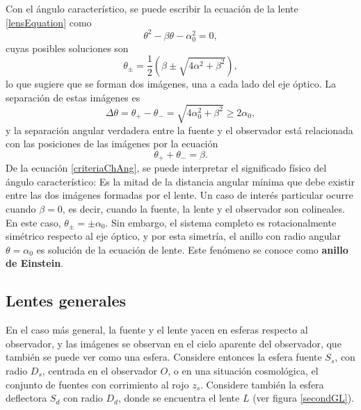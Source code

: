 Con el ángulo característico, se puede escribir la ecuación de la lente \eqref{lensEquation} como
\begin{equation}
	\theta^2-\beta\theta-\alpha_0^2=0,
\end{equation}
cuyas posibles soluciones son
\begin{equation}
	\theta_\pm=\frac{1}{2}\left( \beta\pm \sqrt{4\alpha^2+\beta^2}\right),
\end{equation}
lo que sugiere que se forman dos imágenes, una a cada lado del eje óptico. La separación de estas imágenes es
\begin{equation}\label{criteriaChAng}
	\Delta\theta=\theta_+-\theta_-=\sqrt{4\alpha_0^2+\beta^2}\geq 2\alpha_0,
\end{equation}
y la separación angular verdadera entre la fuente y el observador está relacionada con las posiciones de las imágenes por la ecuación
\begin{equation}
	\theta_++\theta_-=\beta.
\end{equation}
De la ecuación \eqref{criteriaChAng}, se puede interpretar el significado físico del ángulo característico: Es la mitad de la distancia angular mínima que debe existir entre las dos imágenes formadas por el lente. Un caso de interés particular ocurre cuando $\beta=0$, es decir, cuando la fuente, la lente y el observador son colineales. En este caso, $\theta_\pm=\pm\alpha_0$. Sin embargo, el sistema completo es rotacionalmente simétrico respecto al eje óptico, y por esta simetría, el anillo con radio angular $\theta=\alpha_0$ es solución de la ecuación de lente. Este fenómeno se conoce como \textbf{anillo de Einstein}.
\subsection{Lentes generales}
En el caso más general, la fuente y el lente yacen en esferas respecto al observador, y las imágenes se observan en el cielo aparente del observador, que también se puede ver como una esfera. Considere entonces la esfera fuente $S_s$, con radio $D_s$, centrada en el observador $O$, o en una situación cosmológica, el conjunto de fuentes con corrimiento al rojo $z_s$. Considere también la esfera deflectora $S_d$ con radio $D_d$, donde se encuentra el lente $L$ (ver figura \ref{secondGL}).

